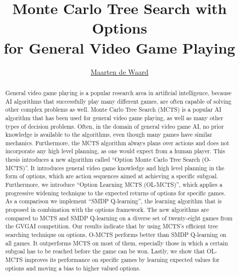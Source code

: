 \documentclass[a4]{report}
\title{Monte Carlo Tree Search with Options\\for General Video Game Playing}
\author{\href{mailto:mrtndwrd@gmail.com}{Maarten de Waard}}
\begin{document}

\maketitle

\begin{abstract}
	General video game playing is a popular research area in artificial
	intelligence, because AI algorithms that successfully play many different
	games, are often capable of solving other complex problems as well.  Monte
	Carlo Tree Search (MCTS) is a popular AI algorithm that has been used for
	general video game playing, as well as many other types of decision
	problems. Often, in the domain of general video game AI, no prior knowledge
	is available to the algorithms, even though many games have similar
	mechanics. Furthermore, the MCTS algorithm always plans over actions and
	does not incorporate any high level planning, as one would expect from a
	human player. This thesis introduces a new algorithm called ``Option Monte
	Carlo Tree Search (O-MCTS)''. It introduces general video game knowledge and
	high level planning in the form of options, which are action sequences aimed
	at achieving a specific subgoal. Furthermore, we introduce ``Option Learning
	MCTS (OL-MCTS)'', which applies a progressive widening technique to the
	expected returns of options for specific games.  As a comparison we
	implement ``SMDP Q-learning'', the learning algorithm that is proposed in
	combination with the options framework.  The new algorithms are compared to
	MCTS and SMDP Q-learning on a diverse set of twenty-eight games from the
	GVGAI competition. Our results indicate that by using MCTS's efficient tree
	searching technique on options, O-MCTS performs better than SMDP Q-learning
	on all games. It outperforms MCTS on most of them, especially those in which
	a certain subgoal has to be reached before the game can be won.  Lastly, we
	show that OL-MCTS improves its performance on specific games by learning
	expected values for options and moving a bias to higher valued options.
\end{abstract}

\tableofcontents




















\end{document}
